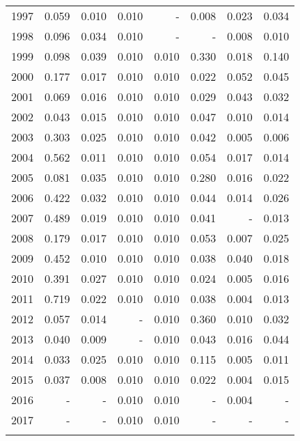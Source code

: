 \begin{longtable}{lrrrrrrr}
  1997 & 0.059 & 0.010 & 0.010 & - & 0.008 & 0.023 & 0.034 \\ 
  1998 & 0.096 & 0.034 & 0.010 & - & - & 0.008 & 0.010 \\ 
  1999 & 0.098 & 0.039 & 0.010 & 0.010 & 0.330 & 0.018 & 0.140 \\ 
  2000 & 0.177 & 0.017 & 0.010 & 0.010 & 0.022 & 0.052 & 0.045 \\ 
  2001 & 0.069 & 0.016 & 0.010 & 0.010 & 0.029 & 0.043 & 0.032 \\ 
  2002 & 0.043 & 0.015 & 0.010 & 0.010 & 0.047 & 0.010 & 0.014 \\ 
  2003 & 0.303 & 0.025 & 0.010 & 0.010 & 0.042 & 0.005 & 0.006 \\ 
  2004 & 0.562 & 0.011 & 0.010 & 0.010 & 0.054 & 0.017 & 0.014 \\ 
  2005 & 0.081 & 0.035 & 0.010 & 0.010 & 0.280 & 0.016 & 0.022 \\ 
  2006 & 0.422 & 0.032 & 0.010 & 0.010 & 0.044 & 0.014 & 0.026 \\ 
  2007 & 0.489 & 0.019 & 0.010 & 0.010 & 0.041 & - & 0.013 \\ 
  2008 & 0.179 & 0.017 & 0.010 & 0.010 & 0.053 & 0.007 & 0.025 \\ 
  2009 & 0.452 & 0.010 & 0.010 & 0.010 & 0.038 & 0.040 & 0.018 \\ 
  2010 & 0.391 & 0.027 & 0.010 & 0.010 & 0.024 & 0.005 & 0.016 \\ 
  2011 & 0.719 & 0.022 & 0.010 & 0.010 & 0.038 & 0.004 & 0.013 \\ 
  2012 & 0.057 & 0.014 & - & 0.010 & 0.360 & 0.010 & 0.032 \\ 
  2013 & 0.040 & 0.009 & - & 0.010 & 0.043 & 0.016 & 0.044 \\ 
  2014 & 0.033 & 0.025 & 0.010 & 0.010 & 0.115 & 0.005 & 0.011 \\ 
  2015 & 0.037 & 0.008 & 0.010 & 0.010 & 0.022 & 0.004 & 0.015 \\ 
  2016 & - & - & 0.010 & 0.010 & - & 0.004 & - \\ 
  2017 & - & - & 0.010 & 0.010 & - & - & - \\ 
   \hline
\hline
\label{tab:epsilon1}
\end{longtable}
\endgroup
